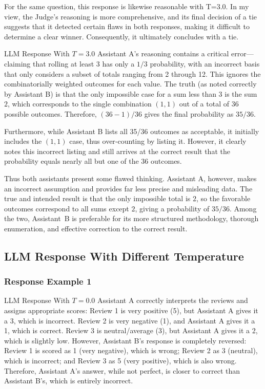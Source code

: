 \documentclass[11pt]{article}
\begin{document}
For the same question, this response is likewise reasonable with T=3.0. In my view, the Judge’s reasoning is more comprehensive, and its final decision of a tie suggests that it detected certain flaws in both responses, making it difficult to determine a clear winner. Consequently, it ultimately concludes with a tie.



\begin{responsebox}{LLM Response With $T=3.0$}
Assistant A's reasoning contains a critical error---claiming that rolling at least 3 has only a $1/3$ probability, with an incorrect basis that only considers a subset of totals ranging from 2 through 12. This ignores the combinatorially weighted outcomes for each value. The truth (as noted correctly by Assistant B) is that the only impossible case for a sum less than 3 is the sum~$2$, which corresponds to the single combination $(1,1)$ out of a total of 36 possible outcomes. Therefore, $(36 - 1)/36$ gives the final probability as $35/36$.

Furthermore, while Assistant B lists all 35/36 outcomes as acceptable, it initially includes the $(1,1)$ case, thus over‑counting by listing it. However, it clearly notes this incorrect listing and still arrives at the correct result that the probability equals nearly all but one of the 36 outcomes.

Thus both assistants present some flawed thinking. Assistant A, however, makes an incorrect assumption and provides far less precise and misleading data. The true and intended result is that the only impossible total is $2$, so the favorable outcomes correspond to all sums except $2$, giving a probability of $35/36$. Among the two, Assistant~B is preferable for its more structured methodology, thorough enumeration, and effective correction to the correct result.
\end{responsebox}


\subsection{LLM Response With Different Temperature}
\label{sec:llm_response_different_temp}

\subsubsection{Response Example 1}

\begin{responsebox}{LLM Response With $T=0.0$}
Assistant A correctly interprets the reviews and assigns appropriate scores: Review 1 is very
positive (5), but Assistant A gives it a 3, which is incorrect. Review 2 is very negative (1), and
Assistant A gives it a 1, which is correct. Review 3 is neutral/average (3), but Assistant A gives
it a 2, which is slightly low. However, Assistant B's response is completely reversed: Review 1 is
scored as 1 (very negative), which is wrong; Review 2 as 3 (neutral), which is incorrect; and Review
3 as 5 (very positive), which is also wrong. Therefore, Assistant A's answer, while not perfect, is
closer to correct than Assistant B's, which is entirely incorrect.
\end{responsebox}
\end{document}

